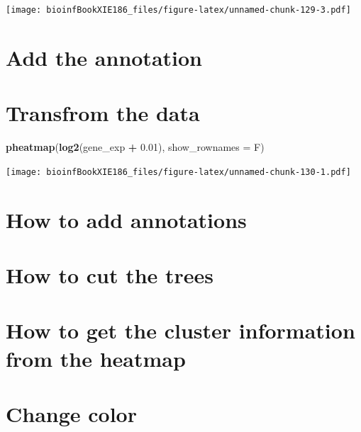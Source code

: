 \documentclass[]{book}
\makeatletter
\newenvironment{Shaded}{\begin{snugshade}}{\end{snugshade}}
\newcommand{\DataTypeTok}[1]{\textcolor[rgb]{0.13,0.29,0.53}{#1}}
\newcommand{\FloatTok}[1]{\textcolor[rgb]{0.00,0.00,0.81}{#1}}
\newcommand{\KeywordTok}[1]{\textcolor[rgb]{0.13,0.29,0.53}{\textbf{#1}}}
\newcommand{\NormalTok}[1]{#1}
\newcommand{\OperatorTok}[1]{\textcolor[rgb]{0.81,0.36,0.00}{\textbf{#1}}}
\newcommand{\StringTok}[1]{\textcolor[rgb]{0.31,0.60,0.02}{#1}}
\newenvironment{kframe}{%
\medskip{}
\setlength{\fboxsep}{.8em}
 \def\at@end@of@kframe{}%
 \ifinner\ifhmode%
  \def\at@end@of@kframe{\end{minipage}}%
  \begin{minipage}{\columnwidth}%
 \fi\fi%
 \def\FrameCommand##1{\hskip\@totalleftmargin \hskip-\fboxsep
 \colorbox{shadecolor}{##1}\hskip-\fboxsep
     \hskip-\linewidth \hskip-\@totalleftmargin \hskip\columnwidth}%
 \MakeFramed {\advance\hsize-\width
   \@totalleftmargin\z@ \linewidth\hsize
   \@setminipage}}%
 {\par\unskip\endMakeFramed%
 \at@end@of@kframe}
\renewenvironment{Shaded}{\begin{kframe}}{\end{kframe}}
\makeatother
\begin{document}
\texttt{[image: bioinfBookXIE186\_files/figure-latex/unnamed-chunk-129-3.pdf]}

\hypertarget{add-the-annotation}{%
\section{Add the annotation}\label{add-the-annotation}}

\hypertarget{section}{%
\section{}\label{section}}

\hypertarget{transfrom-the-data}{%
\section{Transfrom the data}\label{transfrom-the-data}}

\begin{Shaded}
\begin{Highlighting}[]
\KeywordTok{pheatmap}\NormalTok{(}\KeywordTok{log2}\NormalTok{(gene_exp }\OperatorTok{+}\StringTok{ }\FloatTok{0.01}\NormalTok{), }\DataTypeTok{show_rownames =}\NormalTok{ F) }
\end{Highlighting}
\end{Shaded}

\texttt{[image: bioinfBookXIE186\_files/figure-latex/unnamed-chunk-130-1.pdf]}

\hypertarget{how-to-add-annotations}{%
\section{How to add annotations}\label{how-to-add-annotations}}

\hypertarget{how-to-cut-the-trees}{%
\section{How to cut the trees}\label{how-to-cut-the-trees}}

\hypertarget{how-to-get-the-cluster-information-from-the-heatmap}{%
\section{How to get the cluster information from the heatmap}\label{how-to-get-the-cluster-information-from-the-heatmap}}

\hypertarget{change-color}{%
\section{Change color}\label{change-color}}
\end{document}
